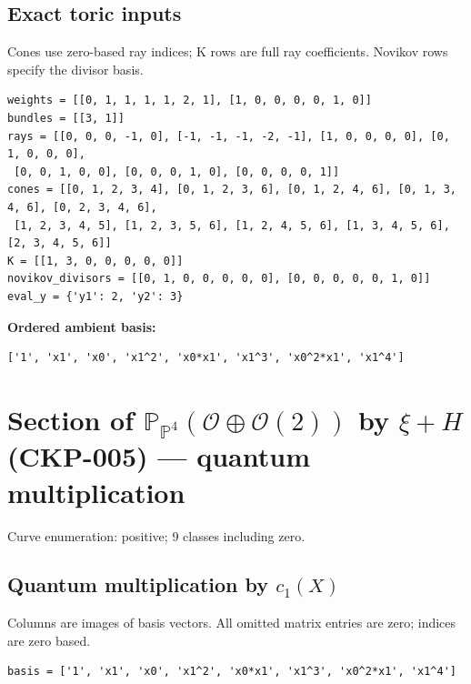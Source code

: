 \documentclass[10pt,a4paper]{article}
\begin{document}
\subsection*{Exact toric inputs}
Cones use zero-based ray indices; K rows are full ray coefficients. Novikov rows specify the divisor basis.

\begin{lstlisting}
weights = [[0, 1, 1, 1, 1, 2, 1], [1, 0, 0, 0, 0, 1, 0]]
bundles = [[3, 1]]
rays = [[0, 0, 0, -1, 0], [-1, -1, -1, -2, -1], [1, 0, 0, 0, 0], [0, 1, 0, 0, 0],
 [0, 0, 1, 0, 0], [0, 0, 0, 1, 0], [0, 0, 0, 0, 1]]
cones = [[0, 1, 2, 3, 4], [0, 1, 2, 3, 6], [0, 1, 2, 4, 6], [0, 1, 3, 4, 6], [0, 2, 3, 4, 6],
 [1, 2, 3, 4, 5], [1, 2, 3, 5, 6], [1, 2, 4, 5, 6], [1, 3, 4, 5, 6], [2, 3, 4, 5, 6]]
K = [[1, 3, 0, 0, 0, 0, 0]]
novikov_divisors = [[0, 1, 0, 0, 0, 0, 0], [0, 0, 0, 0, 0, 1, 0]]
eval_y = {'y1': 2, 'y2': 3}
\end{lstlisting}

\textbf{Ordered ambient basis:}
\begin{lstlisting}
['1', 'x1', 'x0', 'x1^2', 'x0*x1', 'x1^3', 'x0^2*x1', 'x1^4']
\end{lstlisting}

\clearpage\section*{Section of $\mathbb P_{\mathbb P^{4}}(\mathcal O\oplus \mathcal O(2))$ by $\xi +H$ (CKP-005) --- quantum multiplication}

Curve enumeration: positive; 9 classes including zero.
\subsection*{Quantum multiplication by $c_1(X)$}
Columns are images of basis vectors. All omitted matrix entries are zero; indices are zero based.

\begin{lstlisting}
basis = ['1', 'x1', 'x0', 'x1^2', 'x0*x1', 'x1^3', 'x0^2*x1', 'x1^4']
\end{lstlisting}
\end{document}
